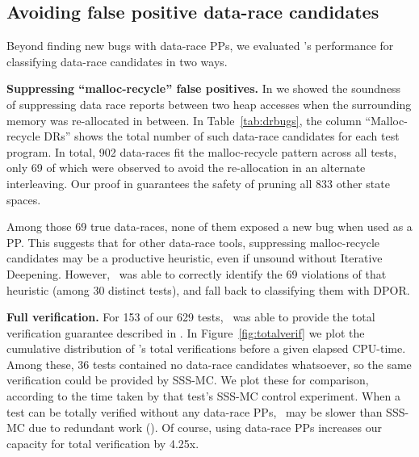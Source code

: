 %


\subsection{Avoiding false positive data-race candidates}
\label{sec:eval-falsepos}

Beyond finding new bugs with data-race PPs, we evaluated \quicksand's performance for classifying data-race candidates in two ways.

{\bf Suppressing ``malloc-recycle'' false positives.}
In \sect{\ref{sec:recycle}} we showed the soundness of suppressing data race reports between two heap accesses when the surrounding memory was re-allocated in between.
In Table~\ref{tab:drbugs}, the column ``Malloc-recycle DRs'' shows the total number of such data-race candidates for each test program.
In total, 902 data-races fit the malloc-recycle pattern across all tests,
only 69 of which were observed to avoid the re-allocation in an alternate interleaving.
Our proof in \sect{\ref{sec:recycle}} guarantees the safety of pruning all 833 other state spaces.

Among those 69 true data-races, %
none of them exposed a new bug when used as a PP.
This suggests that for other data-race tools,
suppressing malloc-recycle candidates may be a productive heuristic,
even if unsound without Iterative Deepening.
However, \quicksand~was able to correctly identify the 69 violations of that heuristic (among 30 distinct tests),
and fall back to classifying them with DPOR.

{\bf Full verification.}
For 153 of our 629 tests, \quicksand~was able to provide the total verification guarantee described in \sect{\ref{sec:totalverif}}.
In Figure~\ref{fig:totalverif} we plot the cumulative distribution of \quicksand's total verifications before a given elapsed CPU-time.
Among these, 36 tests contained no data-race candidates whatsoever,
so the same verification could be provided by SSS-MC.
We plot these for comparison,
according to the time taken by that test's SSS-MC control experiment.
When a test can be totally verified without any data-race PPs,
\quicksand~may be slower than SSS-MC due to redundant work (\sect{\ref{sec:future}}).
Of course, using data-race PPs increases our capacity for total verification by 4.25x.

